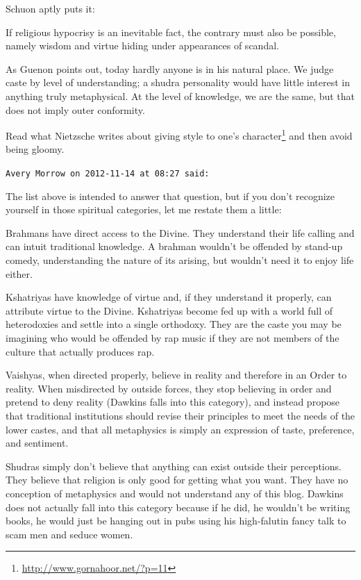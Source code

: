 \begin{footnotesize}
\begin{sffamily}
Schuon aptly puts it:

\begin{quotex}
If religious hypocrisy is an inevitable fact, the contrary must also be possible, namely wisdom and virtue hiding under appearances of scandal.

\end{quotex}
As Guenon points out, today hardly anyone is in his natural place. We judge caste by level of understanding; a shudra personality would have little interest in anything truly metaphysical. At the level of knowledge, we are the same, but that does not imply outer conformity.

Read what Nietzsche writes about giving style to one's character\footnote{\url{http://www.gornahoor.net/?p=11}} and then avoid being gloomy.


\hfill

\texttt{Avery Morrow on 2012-11-14 at 08:27 said: }

The list above is intended to answer that question, but if you don't recognize yourself in those spiritual categories, let me restate them a little:

Brahmans have direct access to the Divine. They understand their life calling and can intuit traditional knowledge. A brahman wouldn't be offended by stand-up comedy, understanding the nature of its arising, but wouldn't need it to enjoy life either.

Kshatriyas have knowledge of virtue and, if they understand it properly, can attribute virtue to the Divine. Kshatriyas become fed up with a world full of heterodoxies and settle into a single orthodoxy. They are the caste you may be imagining who would be offended by rap music if they are not members of the culture that actually produces rap.

Vaishyas, when directed properly, believe in reality and therefore in an Order to reality. When misdirected by outside forces, they stop believing in order and pretend to deny reality (Dawkins falls into this category), and instead propose that traditional institutions should revise their principles to meet the needs of the lower castes, and that all metaphysics is simply an expression of taste, preference, and sentiment.

Shudras simply don't believe that anything can exist outside their perceptions. They believe that religion is only good for getting what you want. They have no conception of metaphysics and would not understand any of this blog. Dawkins does not actually fall into this category because if he did, he wouldn't be writing books, he would just be hanging out in pubs using his high-falutin fancy talk to scam men and seduce women.


\end{sffamily}
\end{footnotesize}
